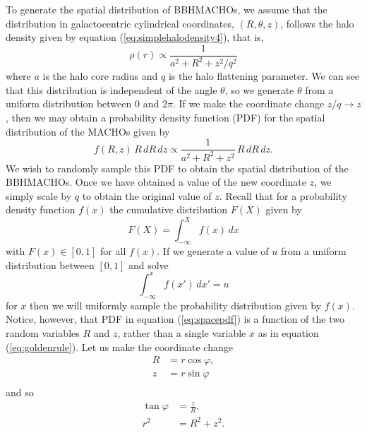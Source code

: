 To generate the spatial distribution of BBHMACHOs, we assume that the
distribution in galactocentric cylindrical coordinates, $(R,\theta,z)$,
follows the halo density given by equation (\ref{eq:simplehalodensity4}),
that is,
\begin{equation}
\rho(r) \propto \frac{1}{a^2 + R^2 + z^2/q^2}
\end{equation}
where $a$ is the halo core radius and $q$ is the halo flattening parameter. We
can see that this distribution is independent of the angle $\theta$, so we
generate $\theta$ from a uniform distribution between $0$ and $2\pi$.  If
we make the coordinate change $z/q \rightarrow z$, then we may obtain a
probability density function (PDF) for the spatial distribution of
the MACHOs given by
\begin{equation}
f(R,z)\,R\, dR\, dz \propto \frac{1}{a^2 + R^2 + z^2}\,R\, dR\, dz.
\label{eq:spacepdf}
\end{equation}
We wish to randomly sample this PDF to obtain the spatial distribution of
the BBHMACHOs. Once we have obtained a value of the new coordinate $z$, we
simply scale by $q$ to obtain the original value of $z$. Recall that for a
probability density function $f(x)$ the cumulative distribution $F(X)$
given by
\begin{equation}
F(X) = \int_{-\infty}^X f(x)\, dx
\end{equation}
with $F(x) \in [0,1]$ for all $f(x)$. If we generate a value of $u$ from
a uniform distribution between $[0,1]$ and solve
\begin{equation}
\int_{-\infty}^x f(x')\, dx' = u
\label{eq:goldenrule}
\end{equation}
for $x$ then we will uniformly sample the probability distribution given by
$f(x)$.  Notice, however, that PDF in equation (\ref{eq:spacepdf}) is a
function of the two random variables $R$ and $z$, rather than a single
variable $x$ as in equation (\ref{eq:goldenrule}).  Let us make the coordinate
change
\begin{equation}
\begin{split}
R &= r \cos \varphi, \\
z &= r \sin \varphi \\
\label{eq:probcoordtrans}
\end{split}
\end{equation}
and so
\begin{equation}
\begin{split}
\tan \varphi &= \frac{z}{R}, \\
r^2 &= R^2 + z^2. \\
\end{split}
\end{equation}
